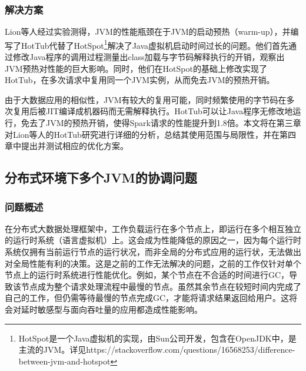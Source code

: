 \documentclass[lang=cn,12pt,a4paper,cite=authoryear]{elegantpaper}
\begin{document}
\subsubsection{解决方案}
Lion等人经过实验测得，JVM的性能瓶颈在于JVM的启动预热（warm-up），并编写了HotTub\cite{DBLP:conf/osdi/LionCSZGY16}代替了HotSpot\footnote{HotSpot是一个Java虚拟机的实现，由Sun公司开发，包含在OpenJDK中，是主流的JVM。详见https://stackoverflow.com/questions/16568253/difference-between-jvm-and-hotspot}解决了Java虚拟机启动时间过长的问题。他们首先通过修改Java程序的调用过程测量出class加载与字节码解释执行的开销，观察出JVM预热对性能的巨大影响。同时，他们在HotSpot的基础上修改实现了HotTub，在多次请求中复用同一个JVM实例，从而免去JVM的预热开销。

由于大数据应用的相似性，JVM有较大的复用可能，同时频繁使用的字节码在多次复用后被JIT编译成机器码而无需解释执行。HotTub可以让Java程序无修改地运行，免去了JVM的预热开销，使得Spark请求的性能提升到1.8倍。本文将在第三章对Lion等人的HotTub研究进行详细的分析，总结其使用范围与局限性，并在第四章中提出并测试相应的优化方案。

\subsection{分布式环境下多个JVM的协调问题}
\subsubsection{问题概述}
在分布式大数据处理框架中，工作负载运行在多个节点上，即运行在多个相互独立的运行时系统（语言虚拟机）上。这会成为性能降低的原因之一，因为每个运行时系统仅拥有当前运行节点的运行状况，而非全局的分布式应用的运行状，无法做出对全局性能有利的决策。这是之前的工作无法解决的问题，之前的工作仅针对单个节点上的运行时系统进行性能优化。例如，某个节点在不合适的时间进行GC，导致该节点成为整个请求处理流程中最慢的节点。虽然其余节点在较短时间内完成了自己的工作，但仍需等待最慢的节点完成GC，才能将请求结果返回给用户。这将会对延时敏感型与面向吞吐量的应用都造成性能影响。
\end{document}
